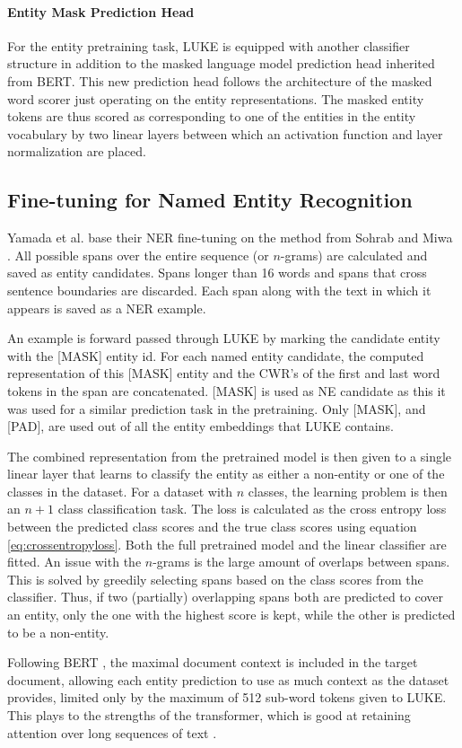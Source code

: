 \documentclass[main.tex]{subfiles}
\begin{document}
\paragraph{Entity Mask Prediction Head}
For the entity pretraining task, LUKE is equipped with another classifier structure in addition to the masked language model prediction head inherited from BERT.
This new prediction head follows the architecture of the masked word scorer just operating on the entity representations.
The masked entity tokens are thus scored as corresponding to one of the entities in the entity vocabulary by two linear layers between which an activation function and layer normalization are placed.

\subsection{Fine-tuning for Named Entity Recognition}
\label{subsec:finetuning-theory}
Yamada et al. base their NER fine-tuning on the method from Sohrab and Miwa \cite{sohrab2018nestedner}.
All possible spans over the entire sequence (or $n$-grams) are calculated and saved as entity candidates.
Spans longer than 16 words and spans that cross sentence boundaries are discarded.
Each span along with the text in which it appears is saved as a NER example.

An example is forward passed through LUKE by marking the candidate entity with the [MASK] entity id.
For each named entity candidate, the computed representation of this [MASK] entity and the CWR's of the first and last word tokens in the span are concatenated.
[MASK] is used as NE candidate as this it was used for a similar prediction task in the pretraining.
Only [MASK], and [PAD], are used out of all the entity embeddings that LUKE contains.

The combined representation from the pretrained model is then given to a single linear layer that learns to classify the entity as either a non-entity or one of the classes in the dataset.
For a dataset with $ n $ classes, the learning problem is then an $ n+1 $ class classification task.
The loss is calculated as the cross entropy loss between the predicted class scores and the true class scores using equation \eqref{eq:crossentropyloss}.
Both the full pretrained model and the linear classifier are fitted.
An issue with the $ n $-grams is the large amount of overlaps between spans.
This is solved by greedily selecting spans based on the class scores from the classifier.
Thus, if two (partially) overlapping spans both are predicted to cover an entity, only the one with the highest score is kept, while the other is predicted to be a non-entity.

Following BERT \cite{devlin2019bert}, the maximal document context is included in the target document, allowing each entity prediction to use as much context as the dataset provides, limited only by the maximum of 512 sub-word tokens given to LUKE.
This plays to the strengths of the transformer, which is good at retaining attention over long sequences of text \cite{vaswani2017att}.
\cite{yamada2020luke}
\end{document}
